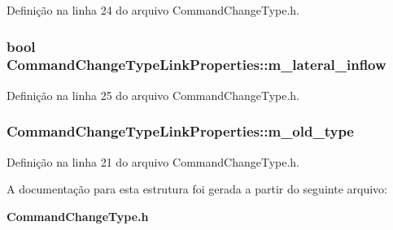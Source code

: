 Definição na linha 24 do arquivo Command\+Change\+Type.\+h.

\subsubsection[{m\+\_\+lateral\+\_\+inflow}]{\setlength{\rightskip}{0pt plus 5cm}bool Command\+Change\+Type\+Link\+Properties\+::m\+\_\+lateral\+\_\+inflow}\label{struct_command_change_type_link_properties_a23bfde1a80bfef6fde8d0d852bb7e3fa}


Definição na linha 25 do arquivo Command\+Change\+Type.\+h.

\subsubsection[{m\+\_\+old\+\_\+type}]{ Command\+Change\+Type\+Link\+Properties\+::m\+\_\+old\+\_\+type}\label{struct_command_change_type_link_properties_a250fb7d984e2e370bd35b08f57be69da}


Definição na linha 21 do arquivo Command\+Change\+Type.\+h.



A documentação para esta estrutura foi gerada a partir do seguinte arquivo\+:\begin{DoxyCompactItemize}
\item 
{\bf Command\+Change\+Type.\+h}\end{DoxyCompactItemize}
